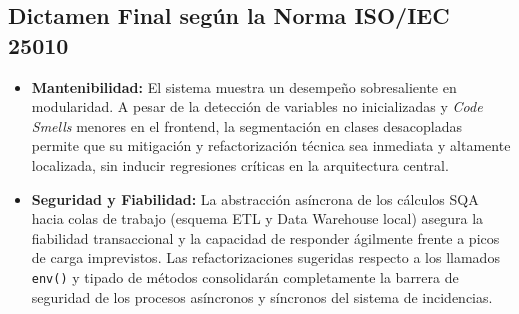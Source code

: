 \subsection{Dictamen Final según la Norma ISO/IEC 25010}

\begin{itemize}
    \item \textbf{Mantenibilidad:} El sistema muestra un desempeño sobresaliente en modularidad. A pesar de la detección de variables no inicializadas y \textit{Code Smells} menores en el frontend, la segmentación en clases desacopladas permite que su mitigación y refactorización técnica sea inmediata y altamente localizada, sin inducir regresiones críticas en la arquitectura central.
    \item \textbf{Seguridad y Fiabilidad:} La abstracción asíncrona de los cálculos SQA hacia colas de trabajo (esquema ETL y Data Warehouse local) asegura la fiabilidad transaccional y la capacidad de responder ágilmente frente a picos de carga imprevistos. Las refactorizaciones sugeridas respecto a los llamados \texttt{env()} y tipado de métodos consolidarán completamente la barrera de seguridad de los procesos asíncronos y síncronos del sistema de incidencias.
\end{itemize}
